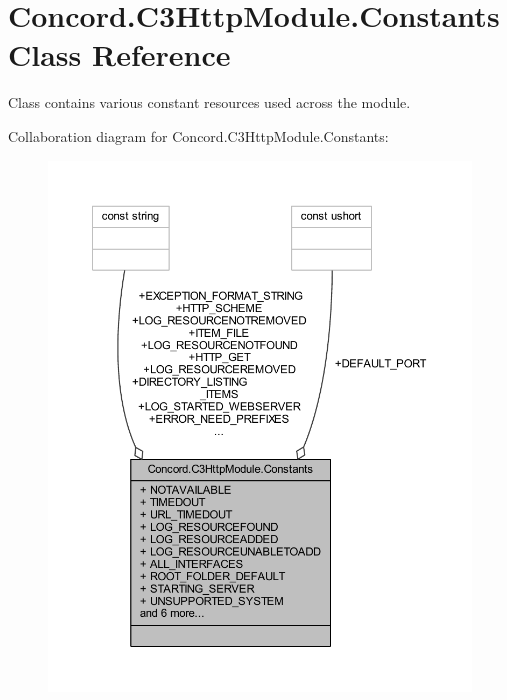 \hypertarget{class_concord_1_1_c3_http_module_1_1_constants}{}\section{Concord.\+C3\+Http\+Module.\+Constants Class Reference}
\label{class_concord_1_1_c3_http_module_1_1_constants}


Class contains various constant resources used across the module.  




Collaboration diagram for Concord.\+C3\+Http\+Module.\+Constants\+:\nopagebreak
\begin{figure}[H]
\begin{center}
\leavevmode
\includegraphics[width=350pt]{class_concord_1_1_c3_http_module_1_1_constants__coll__graph}
\end{center}
\end{figure}
